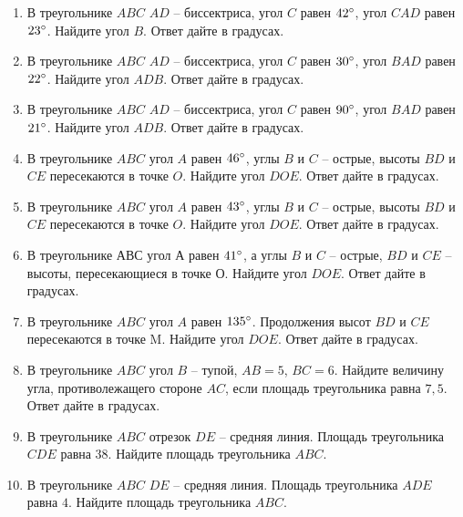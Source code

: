 \documentclass[12pt, a4paper]{article}
\begin{document}
\begin{enumerate}
		\item В треугольнике \( ABC \) \( AD \) – биссектриса, угол \( C \) равен \( 42\degree \), угол \( CAD \) равен \( 23 \degree\). Найдите угол \( B \). Ответ дайте в градусах.
		\item  В треугольнике \( ABC \) \( AD \) – биссектриса, угол \( C \) равен \( 30\degree \), угол \( BAD \) равен \( 22\degree \). Найдите угол \( ADB \). Ответ дайте в градусах.
		\item В треугольнике \( ABC \) \( AD \) – биссектриса, угол \( C \) равен \( 90\degree \), угол \( BAD \) равен \( 21\degree \). Найдите угол \( ADB \). Ответ дайте в градусах.
		\item В треугольнике \( ABC \) угол \( A \) равен \( 46\degree \), углы \( B \) и \( C \) – острые, высоты \( BD \) и \( CE \) пересекаются в точке \( O \). Найдите угол \( DOE \). Ответ дайте в градусах.
		\item В треугольнике \( ABC \) угол \( A \) равен \( 43\degree \), углы \( B \) и \( C \)  – острые, высоты \( BD \) и \( CE \) пересекаются в точке \( O \). Найдите угол \( DOE \). Ответ дайте в градусах.
		\item В треугольнике \( АВС \) угол \( А \) равен \( 41 \degree\), а углы \( B \) и \( C \) – острые, \( BD \) и \( CE \) – высоты, пересекающиеся в точке \( О \). Найдите угол \( DOE \). Ответ дайте в градусах.
		\item В треугольнике \( ABC \) угол \( A \) равен \( 135\degree \). Продолжения высот \( BD \) и \( CE \) пересекаются в точке M. Найдите угол \( DOE \). Ответ дайте в градусах.
		\item В треугольнике \( ABC \) угол \( B \) – тупой, \(AB=5\), \(BC=6\). Найдите величину угла, противолежащего стороне \( AC \), если площадь треугольника равна \( 7,5 \). Ответ дайте в градусах.
		\item В треугольнике \( ABC \) отрезок \( DE \) – средняя линия. Площадь треугольника \( CDE \) равна \( 38 \). Найдите площадь треугольника \( ABC \).
		\item В треугольнике \( ABC \) \(  DE \) – средняя линия. Площадь треугольника \( ADE \) равна \( 4 \). Найдите площадь треугольника \( ABC \).
	\end{enumerate}	
	
\end{document}
